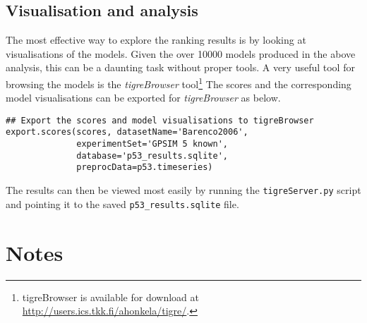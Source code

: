 \documentclass[11pt]{article}
\begin{document}
\subsection{Visualisation and analysis}

The most effective way to explore the ranking results is by looking at
visualisations of the models.  Given the over 10000 models produced in
the above analysis, this can be a daunting task without proper tools.
A very useful tool for browsing the models is the \emph{tigreBrowser}
tool\footnote{tigreBrowser is available for download at
  \url{http://users.ics.tkk.fi/ahonkela/tigre/}.}  The scores and the
corresponding model visualisations can be exported for
\emph{tigreBrowser} as below.

\begin{lstlisting}[frame=single]
## Export the scores and model visualisations to tigreBrowser
export.scores(scores, datasetName='Barenco2006',
              experimentSet='GPSIM 5 known',
              database='p53_results.sqlite',
              preprocData=p53.timeseries)
\end{lstlisting}

The results can then be viewed most easily by running the
\texttt{tigreServer.py} script and pointing it to the saved
\texttt{p53\_results.sqlite} file.

\section{Notes}




\end{document}
